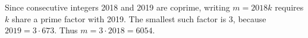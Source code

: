 Since consecutive integers 2018 and 2019 are coprime, writing $m=2018k$ requires $k$ share a prime factor with 2019. The smallest such factor is 3, because $2019=3\cdot673$. Thus $m=3\cdot2018=\boxed{6054}$.
